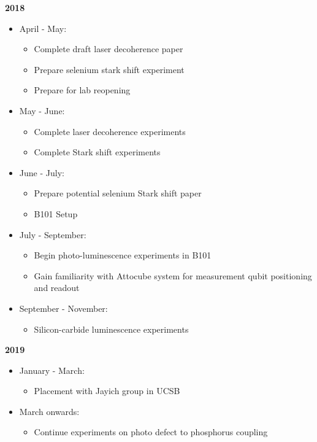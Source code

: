 \textbf{2018}
\begin{itemize}
\item April - May:
\begin{itemize}
\item Complete draft laser decoherence paper
\item Prepare selenium stark shift experiment
\item Prepare for lab reopening
\end{itemize}
\item May - June:
\begin{itemize}
	\item Complete laser decoherence experiments
	\item Complete Stark shift experiments
\end{itemize}
\item June - July:
\begin{itemize}
	\item Prepare potential selenium Stark shift paper
	\item B101 Setup
\end{itemize}
\item July - September:
\begin{itemize}
\item Begin photo-luminescence experiments in B101
\item Gain familiarity with Attocube system for measurement qubit positioning and readout
\end{itemize}
\item September - November:
\begin{itemize}
\item Silicon-carbide luminescence experiments
\end{itemize}
\end{itemize}
\textbf{2019}
\begin{itemize}
\item January - March:
\begin{itemize}
	\item Placement with Jayich group in UCSB
\end{itemize}
\item March onwards:
\begin{itemize}
\item Continue experiments on photo defect to phosphorus coupling
\end{itemize}
\end{itemize}